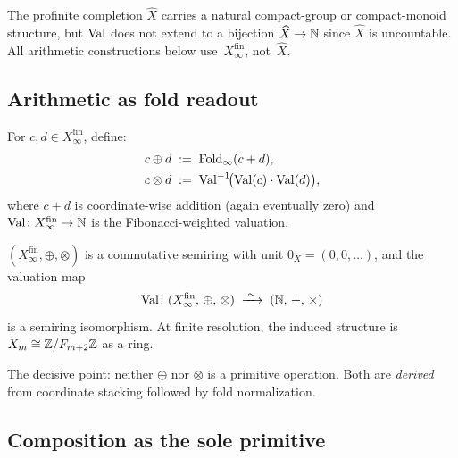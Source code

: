 \begin{remark}\label{rem:finite-vs-profinite}
The profinite completion $\widehat{X}$ carries a natural
compact-group or compact-monoid structure, but $\operatorname{Val}$ does
not extend to a bijection $\widehat{X} \to \mathbb{N}$ since
$\widehat{X}$ is uncountable.  All arithmetic constructions
below use~$X_{\infty}^{\mathrm{fin}}$, not~$\widehat{X}$.
\end{remark}

\subsection{Arithmetic as fold readout}\label{ssec:arith}

\begin{definition}
\label{def:stable-arith}
For $c, d \in X_{\infty}^{\mathrm{fin}}$, define:
\begin{align}
  c \oplus d &\;:=\; \operatorname{Fold}_{\infty}(c + d),
    \label{eq:stable-add}\\
  c \otimes d &\;:=\; \operatorname{Val}^{-1}\!\bigl(\operatorname{Val}(c) \cdot \operatorname{Val}(d)\bigr),
    \label{eq:stable-mul}
\end{align}
where $c + d$ is coordinate-wise addition
(again eventually zero) and
$\operatorname{Val} \colon X_{\infty}^{\mathrm{fin}} \to \mathbb{N}$ is the
Fibonacci-weighted valuation.
\end{definition}

\begin{theorem}
\label{thm:semiring}
$(X_{\infty}^{\mathrm{fin}}, \oplus, \otimes)$ is a commutative
semiring with unit $0_{X} = (0,0,\ldots)$, and the valuation map
\[
  \operatorname{Val} \colon
    (X_{\infty}^{\mathrm{fin}},\, \oplus,\, \otimes)
      \;\xrightarrow{\;\sim\;}\;
    (\mathbb{N},\, +,\, \times)
\]
is a semiring isomorphism.  At finite resolution, the induced
structure is $X_{m} \cong \mathbb{Z} / F_{m+2}\mathbb{Z}$ as a ring.
\end{theorem}

The decisive point: neither $\oplus$ nor $\otimes$ is a primitive
operation.  Both are \emph{derived} from coordinate stacking
followed by fold normalization.

\subsection{Composition as the sole primitive}\label{ssec:sole}

